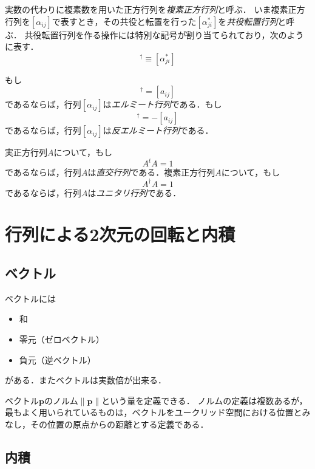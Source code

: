 \documentclass{jsbook}
\newcommand{\keyword}[1]{\emph{#1}}
\newcommand{\bvec}[1]{\boldsymbol{#1}}
\newcommand{\One}{1}%
\newcommand{\norm}[1]{\|{#1}\|}
\begin{document}
実数の代わりに複素数を用いた正方行列を\keyword{複素正方行列}と呼ぶ．
いま複素正方行列を$[\alpha_{ij}]$で表すとき，その共役と転置を行った$[\alpha^*_{ji}]$を\keyword{共役転置行列}と呼ぶ．
共役転置行列を作る操作には特別な記号が割り当てられており，次のように表す．
\begin{equation}
[\alpha_{ij}]^\dagger\equiv[\alpha^*_{ji}]
\end{equation}

もし
\begin{equation}
[a_{ij}]^\dagger=[a_{ij}]
\end{equation}
であるならば，行列$[\alpha_{ij}]$は\keyword{エルミート行列}である．もし
\begin{equation}
[a_{ij}]^\dagger=-[a_{ij}]
\end{equation}
であるならば，行列$[\alpha_{ij}]$は\keyword{反エルミート行列}である．

実正方行列$A$について，もし
\begin{equation}
A^tA=\One
\end{equation}
であるならば，行列$A$は\keyword{直交行列}である．複素正方行列$A$について，もし
\begin{equation}
A^\dagger A=\One
\end{equation}
であるならば，行列$A$は\keyword{ユニタリ行列}である．


\section{行列による2次元の回転と内積}

\subsection{ベクトル}

ベクトルには
\begin{itemize}
\item 和
\item 零元（ゼロベクトル）
\item 負元（逆ベクトル）
\end{itemize}
がある．またベクトルは実数倍が出来る．

ベクトル$\bvec{p}$のノルム$\norm{\bvec{p}}$という量を定義できる．
ノルムの定義は複数あるが，最もよく用いられているものは，ベクトルをユークリッド空間における位置とみなし，その位置の原点からの距離とする定義である．

\subsection{内積}
\end{document}
